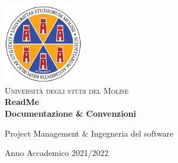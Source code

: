 
\begin{titlepage}
 \begin{center}
     \includegraphics[width=3.5cm]{Learning/09_ReadME_Documentazione/0_frontespizio/imgs/unimol/unimol_color.png}\\
     \vspace{2em}
     {\Large \textsc{Università  degli studi del Molise}}\\
     \vspace{1em}
     \vspace{1em}
     \vspace{2em}
     \vspace{4em}
     {\LARGE\textbf{
     ReadMe\\ Documentazione \& Convenzioni\\
       \vspace{1em}
     }}
\begin{center}
     \LARGE{Project Management \& Ingegneria del software} 
\end{center}
 \end{center}

\begin{center}
  \vspace{\fill} %
{\normalsize Anno Accademico 2021/2022}
\end{center}
\end{titlepage}

\clearpage{\pagestyle{empty}\cleardoublepage}
